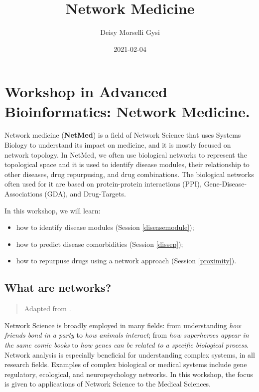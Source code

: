 \documentclass[
]{book}
\title{Network Medicine}
\author{Deisy Morselli Gysi}
\date{2021-02-04}
\providecommand{\tightlist}{%
  \setlength{\itemsep}{0pt}\setlength{\parskip}{0pt}}
\begin{document}
\maketitle

{
\setcounter{tocdepth}{1}
\tableofcontents
}
\hypertarget{workshop-in-advanced-bioinformatics-network-medicine.}{%
\chapter{Workshop in Advanced Bioinformatics: Network Medicine.}\label{workshop-in-advanced-bioinformatics-network-medicine.}}

Network medicine (\textbf{NetMed}) is a field of Network Science that uses Systems Biology to understand its impact on medicine, and it is mostly focused on network topology. In NetMed, we often use biological networks to represent the topological space and it is used to identify disease modules, their relationship to other diseases, drug repurpusing, and drug combinations. The biological networks often used for it are based on protein-protein interactions (PPI), Gene-Disease-Associations (GDA), and Drug-Targets.

In this workshop, we will learn:

\begin{itemize}
\tightlist
\item
  how to identify disease modules (Session \ref{diseasemodule});
\item
  how to predict disease comorbidities (Session \ref{dissep});
\item
  how to repurpuse drugs using a network approach (Session \ref{proximity}).
\end{itemize}

\hypertarget{whatarenets}{%
\section{What are networks?}\label{whatarenets}}

\begin{quote}
Adapted from \citet{Gysi2020}.
\end{quote}

Network Science is broadly employed in many fields: from understanding \emph{how friends bond in a party} to \emph{how animals interact}; from \emph{how superheroes appear in the same comic books} to \emph{how genes can be related to a specific biological process}. Network analysis is especially beneficial for understanding complex systems, in all research fields. Examples of complex biological or medical systems include gene regulatory, ecological, and neuropsychology networks. In this workshop, the focus is given to applications of Network Science to the Medical Sciences.
\end{document}

